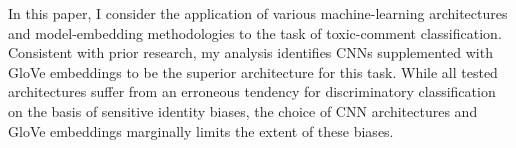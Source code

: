 
In this paper, I consider the application of various machine-learning architectures and model-embedding methodologies to the task of toxic-comment classification. Consistent with prior research, my analysis identifies CNNs supplemented with GloVe embeddings to be the superior architecture for this task. While all tested architectures suffer from an erroneous tendency for discriminatory classification on the basis of sensitive identity biases, the choice of CNN architectures and GloVe embeddings marginally limits the extent of these biases.
